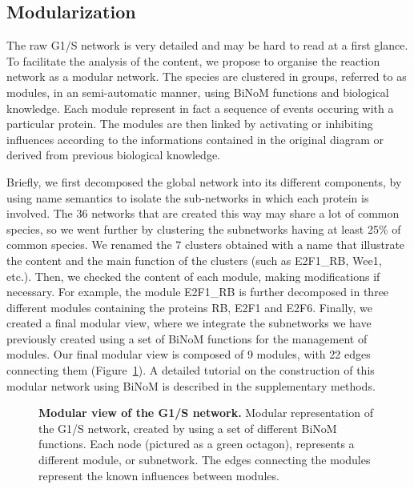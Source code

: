\documentclass[10pt]{bmc_article}
\newenvironment{bmcformat}{\baselineskip20pt\sloppy\setboolean{publ}{false}}{\baselineskip20pt\sloppy}
\begin{document}
\begin{bmcformat}
\subsection*{Modularization} 

The raw G1/S network is very detailed and may be hard to read at a first glance.
To facilitate the analysis of the content, we propose to organise the reaction
network as a modular network. The species are clustered in groups, referred to
as modules, in an semi-automatic manner, using BiNoM functions and biological
knowledge. Each module represent in fact a
sequence of events occuring with a particular protein. The modules are then
linked by activating or inhibiting influences according to the informations
contained in the original diagram or derived from previous biological knowledge.

Briefly, we first decomposed the global network into its different components,
by using name semantics to isolate the sub-networks in which
each protein is involved. The 36 networks that are created this way may share a
lot of common species, so we went further
by clustering the subnetworks having at least 25\% of common species. We renamed
the 7 clusters obtained with a name that illustrate the content and the main
function of the clusters (such as E2F1\_RB, Wee1, etc.). Then, we checked the
content of each module, making modifications if necessary. For example, the
module E2F1\_RB is
further decomposed in three different modules containing the proteins RB, E2F1
and E2F6. Finally, we created a final modular view, where we integrate the
subnetworks we have previously created using a set of BiNoM functions for the
management of modules. Our final modular view is composed of 9 modules, with 22
edges connecting them (Figure~\ref{g1smodular}). A detailed tutorial on the
construction of
this modular network using BiNoM is described in the supplementary methods.


\begin{figure}[h]
 \caption{\label{g1smodular}  \textbf{Modular view of the G1/S network.}
	Modular representation of the G1/S network, created by using a set of
different BiNoM functions. Each node (pictured as a green octagon), represents a
different module, or subnetwork. The edges connecting the modules represent the
 known influences between modules. }
\end{figure}


\end{bmcformat}
\end{document}
